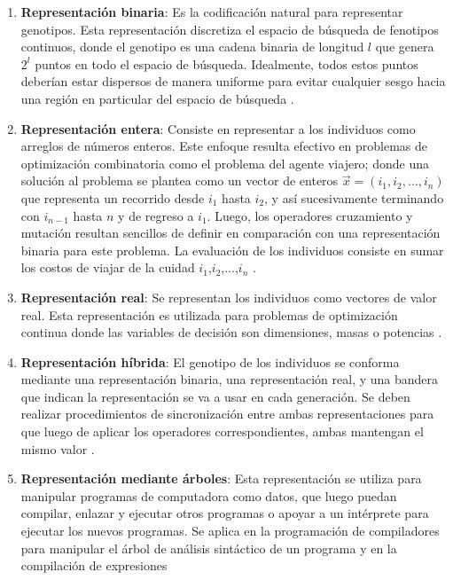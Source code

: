 \begin{enumerate}
\item\textbf{Representación binaria}: Es la codificación natural para representar genotipos. Esta representación discretiza el espacio de búsqueda de fenotipos continuos, donde el genotipo es una cadena binaria de longitud $l$ que genera $2^l$ puntos en todo el espacio de búsqueda. Idealmente, todos estos puntos deberían estar dispersos de manera uniforme para evitar cualquier sesgo hacia una región en particular del espacio de búsqueda \cite{chiam_issues_2006}.
\item\textbf{ Representación entera}: Consiste en representar a los individuos como arreglos de números enteros. Este enfoque resulta efectivo en problemas de optimización combinatoria como el problema del agente viajero; donde una solución al problema se plantea como un vector de enteros $\vec{x}=(i_1,i_2,...,i_n)$ que representa un recorrido desde $i_1$ hasta $i_2$, y así sucesivamente terminando con  $i_{n-1}$  hasta $n$ y de regreso a $i_1$. Luego, los operadores cruzamiento y mutación resultan sencillos de definir en comparación con una representación binaria para este problema. La evaluación de los individuos consiste en sumar los costos de viajar de la cuidad $i_1$,$i_2$,...,$i_n$ \cite{michalewicz_genetic_1995}.  
\item\textbf{ Representación real}: Se representan los individuos como vectores de valor real. Esta representación es utilizada para problemas de optimización continua donde las variables de decisión son dimensiones, masas o potencias \cite{deb_optimization_2004}.
\item\textbf{Representación híbrida}: El genotipo de los individuos se conforma mediante una representación binaria, una representación real, y una bandera que indican la representación se va a usar en cada generación. Se deben realizar procedimientos de sincronización entre ambas representaciones para que luego de aplicar los operadores correspondientes, ambas mantengan el mismo valor \cite{okabe_evolutionary_2003}. 

\item\textbf{Representación mediante árboles}: Esta representación se utiliza para manipular programas de computadora como datos, que luego puedan compilar, enlazar y ejecutar otros programas o apoyar a un intérprete para ejecutar los nuevos programas. Se aplica en la programación de compiladores para manipular el árbol de análisis sintáctico de un programa y en la compilación de expresiones \cite{Koza94geneticprogramming}
\end{enumerate}


